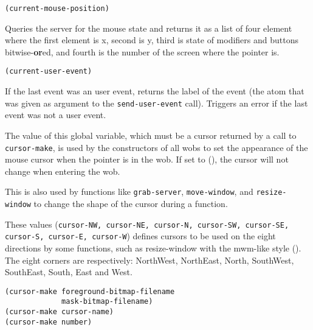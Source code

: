 {\usagefont\begin{verbatim}
(current-mouse-position)
\end{verbatim}}\usageupspace

Queries the server for the mouse state and returns it as a list of
four element where the first element is x, second is y, third is
state of modifiers and buttons bitwise-{\bf or}ed, and fourth
is the number of the screen where the pointer is.


{\usagefont\begin{verbatim}
(current-user-event)
\end{verbatim}}\usageupspace

If the last event was an user event, returns the label of the event (the
atom that was given as argument to the \verb"send-user-event" call).
Triggers an error if the last event was not a user event.

        

The value of this global variable, which must be a cursor returned by a call
to \verb"cursor-make", is used by the constructors of all wobs to set the
appearance of the mouse cursor when the pointer is in the wob. If set to (),
the cursor will not change when entering the wob.

This is also used by functions like \verb"grab-server", \verb"move-window",
and \verb"resize-window" to change the shape of the cursor during a function.



These values ({\tt cursor-NW, cursor-NE, cursor-N, cursor-SW, cursor-SE,
cursor-S, cursor-E, cursor-W}) defines cursors to be used on the eight
directions by some functions, such as resize-window with the mwm-like style
(). The eight corners are respectively: NorthWest,
NorthEast, North, SouthWest, SouthEast, South, East and West.

        
{\usagefont\begin{verbatim}
(cursor-make foreground-bitmap-filename 
             mask-bitmap-filename)
(cursor-make cursor-name)
(cursor-make number)
\end{verbatim}}\usageupspace

